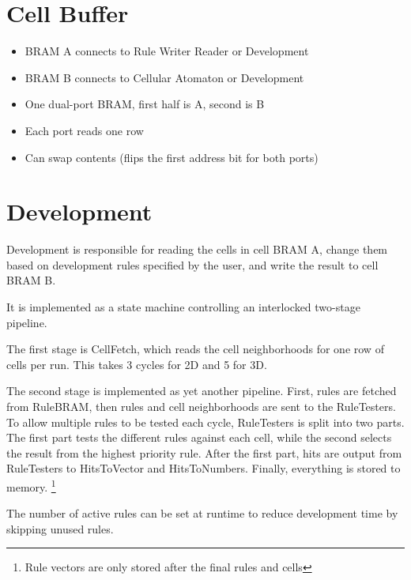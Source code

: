 \section{Cell Buffer}

\begin{itemize}
    \item BRAM A connects to Rule Writer Reader or Development
    \item BRAM B connects to Cellular Atomaton or Development
    \item One dual-port BRAM, first half is A, second is B
    \item Each port reads one row
    \item Can swap contents (flips the first address bit for both ports)
\end{itemize}


\section{Development}
\label{sec:development}

Development is responsible for reading the cells in cell BRAM A, change them based on development rules specified by the user, and write the result to cell BRAM B.

It is implemented as a state machine controlling an interlocked two-stage pipeline.

The first stage is CellFetch, which reads the cell neighborhoods for one row of cells per run.
This takes 3 cycles for 2D and 5 for 3D.

The second stage is implemented as yet another pipeline.
First, rules are fetched from RuleBRAM, then rules and cell neighborhoods are sent to the RuleTesters.
To allow multiple rules to be tested each cycle, RuleTesters is split into two parts.
The first part tests the different rules against each cell, while the second selects the result from the highest priority rule.
After the first part, hits are output from RuleTesters to HitsToVector and HitsToNumbers.
Finally, everything is stored to memory.
\footnote{Rule vectors are only stored after the final rules and cells}

The number of active rules can be set at runtime to reduce development time by skipping unused rules.
\TODO
{}

